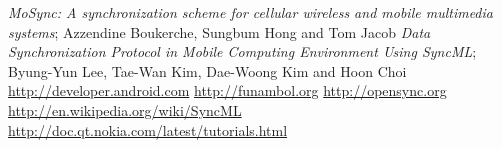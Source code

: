 \begin{thebibliography}{99}
 \emph{MoSync: A synchronization scheme for cellular wireless and mobile multimedia systems}; Azzendine Boukerche, 
Sungbum Hong and Tom Jacob
 \emph{Data Synchronization Protocol in Mobile Computing Environment Using SyncML}; Byung-Yun Lee, Tae-Wan Kim, Dae-Woong Kim and 
Hoon Choi
 \url{http://developer.android.com}
 \url{http://funambol.org}
 \url{http://opensync.org}
 \url{http://en.wikipedia.org/wiki/SyncML}
 \url{http://doc.qt.nokia.com/latest/tutorials.html}
\end{thebibliography}